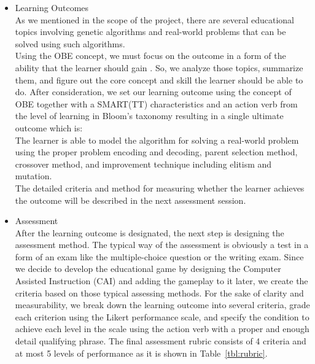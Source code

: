 \documentclass[12pt,oneside,openright,a4paper]{cpe-english-project}
\begin{document}
\begin{itemize}
	\item Learning Outcomes \\
	As we mentioned in the scope of the project, there are several educational topics involving genetic algorithms and real-world problems that can be solved using such algorithms. \\
	Using the OBE concept, we must focus on the outcome in a form of the ability that the learner should gain \cite{kmuttobe}. So, we analyze those topics, summarize them, and figure out the core concept and skill the learner should be able to do. After consideration, we set our learning outcome using the concept of OBE together with a SMART(TT) characteristics and an action verb from the level of learning in Bloom's taxonomy \cite{christine2021tophat} resulting in a single ultimate outcome which is: \\
	The learner is able to model the algorithm for solving a real-world problem using the proper problem encoding and decoding, parent selection method, crossover method, and improvement technique including elitism and mutation.\\
	The detailed criteria and method for measuring whether the learner achieves the outcome will be described in the next assessment session.

	\item Assessment \\
	After the learning outcome is designated, the next step is designing the assessment method. The typical way of the assessment is obviously a test in a form of an exam like the multiple-choice question or the writing exam. Since we decide to develop the educational game by designing the Computer Assisted Instruction (CAI) and adding the gameplay to it later, we create the criteria based on those typical assessing methods.
	For the sake of clarity and measurability, we break down the learning outcome into several criteria, grade each criterion using the Likert performance scale, and specify the condition to achieve each level in the scale using the action verb with a proper and enough detail qualifying phrase. The final assessment rubric consists of 4 criteria and at most 5 levels of performance as it is shown in Table~\ref{tbl:rubric}.


\end{itemize}
\end{document}
